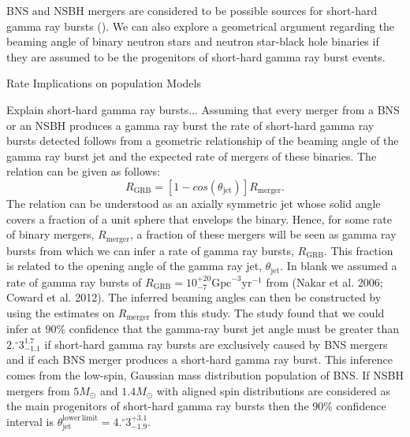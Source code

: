 BNS and NSBH mergers are considered to be possible sources for short-hard gamma ray bursts (). We can also explore a geometrical argument regarding the beaming angle of binary neutron stars and neutron star-black hole binaries if they are assumed to be the progenitors of short-hard gamma ray burst events.

Rate Implications on population Models

Explain short-hard gamma ray bursts...
Assuming that every merger from a BNS or an NSBH produces a gamma ray burst the rate of short-hard gamma ray bursts detected follows from a geometric relationship of the beaming angle of the gamma ray burst jet and the expected rate of mergers of these binaries. The relation can be given as follows:
\begin{equation}\label{eqn:grb_jet_angle}
    R_\mathrm{GRB} = \left[ 1 - cos \left(\theta_\mathrm{jet}\right) \right] R_\mathrm{merger}.
\end{equation}
The relation can be understood as an axially symmetric jet whose solid angle covers a fraction of a unit sphere that envelops the binary. Hence, for some rate of binary mergers, $R_\mathrm{merger}$, a fraction of these mergers will be seen as gamma ray bursts from which we can infer a rate of gamma ray bursts, $R_\mathrm{GRB}$. This fraction is related to the opening angle of the gamma ray jet, $\theta_\mathrm{jet}$. In blank we assumed a rate of gamma ray bursts of $R_{\mathrm{GRB}} = 10^{+20}_{-7} \mathrm{Gpc}^{-3} \mathrm{yr}^{-1}$ from (Nakar et al. 2006; Coward et al. 2012). The inferred beaming angles can then be constructed by using the estimates on $R_\mathrm{merger}$ from this study. The study found that we could infer at $90\%$ confidence that the gamma-ray burst jet angle must be greater than $2.\!\!^\circ3_{-1.1}^{1.7}$ if short-hard gamma ray bursts are exclusively caused by BNS mergers and if each BNS merger produces a short-hard gamma ray burst. This inference comes from the low-spin, Gaussian mass distribution population of BNS. If NSBH mergers from $5 M_\odot$ and $1.4 M_\odot$ with aligned spin distributions are considered as the main progenitors of short-hard gamma ray bursts then the 90$\%$ confidence interval is $\theta^{\mathrm{lower \, limit}}_\mathrm{jet} = 4.\!\!^\circ3_{-1.9}^{+3.1}$.

